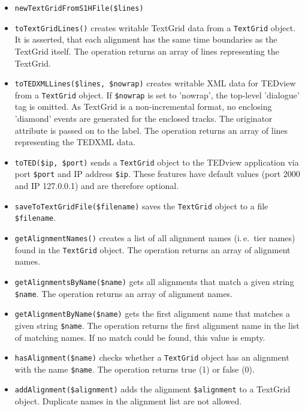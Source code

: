 \documentclass[a4,twoside=off,draft=true]{scrartcl}
\begin{document}
\begin{itemize}
\item {\tt newTextGridFromS1HFile(\$lines)}


\item {\tt toTextGridLines()} creates writable TextGrid data from a {\tt TextGrid} object. 
It is asserted, that each alignment has the same time boundaries as the TextGrid itself. 
The operation returns an array of lines representing the TextGrid. 

\item {\tt toTEDXMLLines(\$lines, \$nowrap)} creates writable XML data for TEDview from a {\tt TextGrid} object. 
If {\tt \$nowrap} is set to 'nowrap', the top-level 'dialogue' tag is
omitted. 
As TextGrid is a non-incremental format, no enclosing 'diamond' events are generated for
the enclosed tracks.
The originator attribute is passed on to the label.
The operation returns an array of lines representing the TEDXML data. 

\item {\tt toTED(\$ip, \$port)} sends a {\tt TextGrid} object 
to the TEDview application via port {\tt \$port} and IP address {\tt \$ip}. 
These features have default values (port 2000 and IP 127.0.0.1) and are therefore optional.  

\item {\tt saveToTextGridFile(\$filename)} saves the {\tt TextGrid} object to a file {\tt \$filename}.

\item {\tt getAlignmentNames()} creates a list of all alignment names (i.\,e.\ tier names) found in the {\tt TextGrid} object. 
The operation returns an array of alignment names.

\item {\tt getAlignmentsByName(\$name)} gets all alignments that match a given string {\tt \$name}. 
The operation returns an array of alignment names.

\item {\tt getAlignmentByName(\$name)} gets the first alignment name that matches a given string  {\tt \$name}. 
The operation returns the first alignment name in the list of matching names. If no match could be found, this value is empty. 

\item {\tt hasAlignment(\$name)} checks whether a {\tt TextGrid} object has an alignment with the name {\tt \$name}. 
The operation returns true (1) or false (0).   

\item {\tt addAlignment(\$alignment)} adds the alignment {\tt \$alignment} to a TextGrid object. Duplicate names in the alignment list are not allowed. 


\end{itemize}
\end{document}
